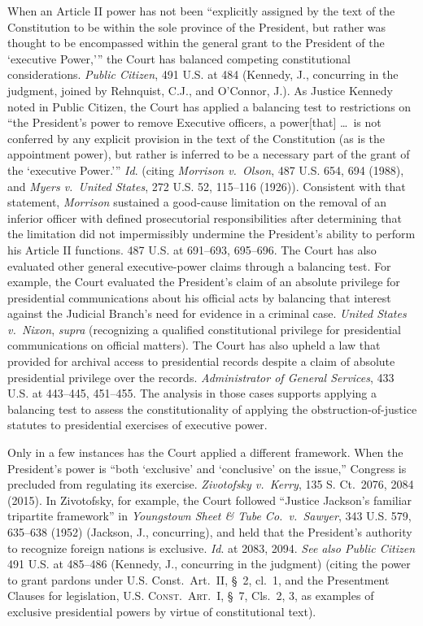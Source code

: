 When an Article II power has not been ``explicitly assigned by the text of the Constitution to be within the sole province of the President, but rather was thought to be encompassed within the general grant to the President of the `executive Power,'{}'' the Court has balanced competing constitutional considerations.
\textit{Public Citizen}, 491 U.S. at 484 (Kennedy, J., concurring in the judgment, joined by Rehnquist, C.J., and O'Connor, J.).
As Justice Kennedy noted in Public Citizen, the Court has applied a balancing test to restrictions on ``the President's power to remove Executive officers, a power[that] \dots\ is not conferred by any explicit provision in the text of the Constitution (as is the appointment power), but rather is inferred to be a necessary part of the grant of the `executive Power.'{}''
\textit{Id}. (citing \textit{Morrison v.\ Olson}, 487 U.S. 654, 694 (1988), and \textit{Myers v.\ United States}, 272 U.S. 52, 115--116 (1926)).
Consistent with that statement, \textit{Morrison} sustained a good-cause limitation on the removal of an inferior officer with defined prosecutorial responsibilities after determining that the limitation did not impermissibly undermine the President's ability to perform his Article II functions.
487 U.S. at 691--693, 695--696.
The Court has also evaluated other general executive-power claims through a balancing test.
For example, the Court evaluated the President's claim of an absolute privilege for presidential communications about his official acts by balancing that interest against the Judicial Branch's need for evidence in a criminal case.
\textit{United States v.\ Nixon}, \textit{supra} (recognizing a qualified constitutional privilege for presidential communications on official matters).
The Court has also upheld a law that provided for archival access to presidential records despite a claim of absolute presidential privilege over the records.
\textit{Administrator of General Services}, 433 U.S. at 443--445, 451--455.
The analysis in those cases supports applying a balancing test to assess the constitutionality of applying the obstruction-of-justice statutes to presidential exercises of executive power.

Only in a few instances has the Court applied a different framework.
When the President's power is ``both `exclusive' and `conclusive' on the issue,'' Congress is precluded from regulating its exercise.
\textit{Zivotofsky v.\ Kerry}, 135 S. Ct.~2076, 2084 (2015).
In Zivotofsky, for example, the Court followed ``Justice Jackson's familiar tripartite framework'' in \textit{Youngstown Sheet \& Tube Co.\ v.\ Sawyer}, 343 U.S. 579, 635--638 (1952) (Jackson, J., concurring), and held that the President's authority to recognize foreign nations is exclusive.
\textit{Id}. at 2083, 2094.
\textit{See also Public Citizen} 491 U.S. at 485--486 (Kennedy, J., concurring in the judgment) (citing the power to grant pardons under U.S. Const.\ Art.~II, \S~2, cl.~1, and the Presentment Clauses for legislation, \textsc{U.S. Const.\ Art.~I}, \S~7, Cls.~2, 3, as examples of exclusive presidential powers by virtue of constitutional text).

